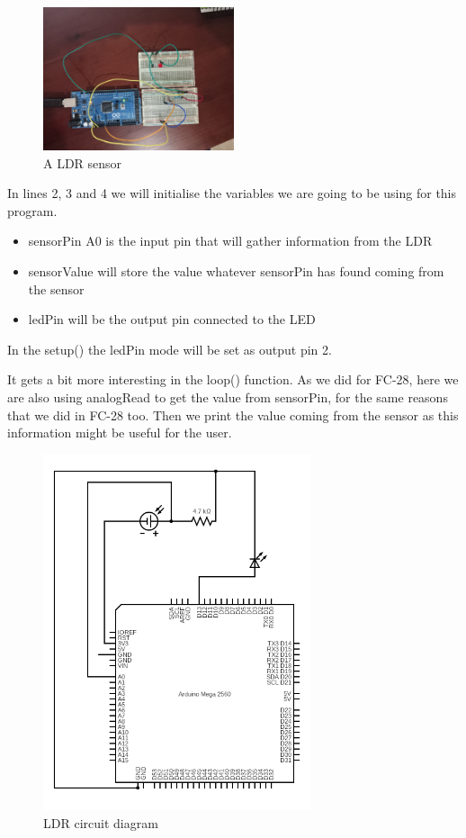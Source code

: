 \begin{figure}[H]
    \centering
    \includegraphics[width=0.5\textwidth]{fig/ldr-circuit.jpg}
    \caption{A LDR sensor}
    \label{fig:ldr}
\end{figure}




In lines 2, 3 and 4 we will initialise the variables we are going to be using for this program.
\begin{itemize}
	\item sensorPin A0 is the input pin that will gather information from the LDR
	\item sensorValue will store the value whatever sensorPin has found coming from the sensor
	\item ledPin will be the output pin connected to the LED
\end{itemize}

In the setup() the ledPin mode will be set as output pin 2.

It gets a bit more interesting in the loop() function. As we did for FC-28, here we are also using analogRead to get the value from sensorPin, for the same reasons that we did in FC-28 too. Then we print the value coming from the sensor as this information might be useful for the user.

\begin{figure}[H]
    \centering
    \includegraphics[width=0.7\textwidth]{fig/ldr-scheme-circuit.png}
    \caption{LDR circuit diagram}
    \label{fig:ldr}
\end{figure}


